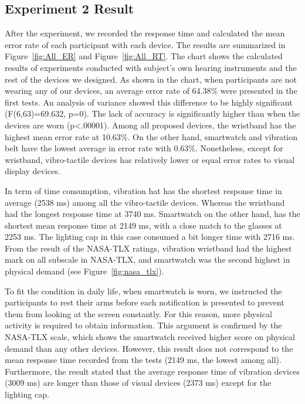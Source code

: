\documentclass{sigchi}
\begin{document}
\subsection{Experiment 2 Result}
After the experiment, we recorded the response time and calculated the mean error rate of each participant with each device. The results are summarized in Figure~\ref{fig:All_ER} and Figure~\ref{fig:All_RT}. The chart shows the calculated results of experiments conducted with subject's own hearing instruments and the rest of the devices we designed. As shown in the chart, when participants are not wearing any of our devices, an average error rate of 64.38\% were presented in the first tests. An analysis of variance showed this difference to be highly significant (F(6,63)=69.632, p=0). The lack of accuracy is significantly higher than when the devices are worn (p\textless.00001). Among all proposed devices, the wristband has the highest mean error rate at 10.63\%. On the other hand, smartwatch and vibration belt have the lowest average in error rate with 0.63\%. Nonetheless, except for wristband, vibro-tactile devices has relatively lower or equal error rates to visual display devices.

In term of time consumption, vibration hat has the shortest response time in average (2538 ms) among all the vibro-tactile devices. Whereas the wristband had the longest response time at 3740 ms. Smartwatch on the other hand, has the shortest mean response time at 2149 ms, with a close match to the glasses at 2253 ms. The lighting cap in this case consumed a bit longer time with 2716 ms. From the result of the NASA-TLX ratings, vibration wristband had the highest mark on all subscale in NASA-TLX, and smartwatch was the second highest in physical demand (see Figure~\ref{fig:nasa_tlx}). 

To fit the condition in daily life, when smartwatch is worn, we instructed the participants to rest their arms before each notification is presented to prevent them from looking at the screen constantly. For this reason, more physical activity is required to obtain information. This argument is confirmed by the NASA-TLX scale, which shows the smartwatch received higher score on physical demand than any other devices. However, this result does not correspond to the mean response time recorded from the tests (2149 ms, the lowest among all). Furthermore, the result stated that the average response time of vibration devices (3009 ms) are longer than those of visual devices (2373 ms) except for the lighting cap.
\end{document}
